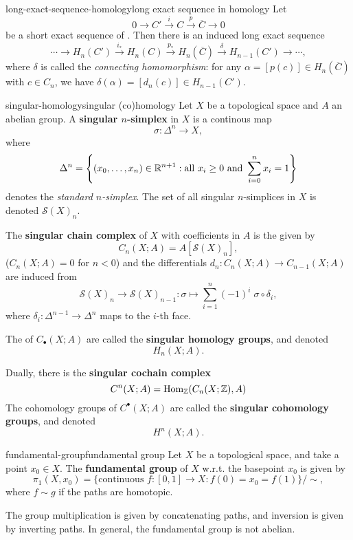 \begin{topic}{long-exact-sequence-homology}{long exact sequence in homology}
    Let
    \[ 0 \rightarrow C' \xrightarrow{i} C \xrightarrow{p} \overline{C} \rightarrow 0 \]
    be a short exact sequence of . Then there is an induced long exact sequence
    \[ \cdots \rightarrow H_n(C') \xrightarrow{i_*} H_n(C) \xrightarrow{p_*} H_n(\overline{C}) \xrightarrow{\delta} H_{n - 1}(C') \rightarrow \cdots , \]
    where $\delta$ is called the \textit{connecting homomorphism}: for any $\alpha = [ p(c) ] \in H_n(\overline{C})$ with $c \in C_n$, we have $\delta(\alpha) = [ d_n(c) ] \in H_{n - 1}(C')$.
\end{topic}

\begin{topic}{singular-homology}{singular (co)homology}
    Let $X$ be a topological space and $A$ an abelian group. A \textbf{singular $n$-simplex} in $X$ is a continous map
    \[ \sigma : \Delta^n \to X , \]
    where 
    \[ \Delta^n = \left\{ (x_0, \ldots, x_n) \in \mathbb{R}^{n + 1} : \text{all } x_i \ge 0 \text{ and } \sum_{i = 0}^n x_i = 1 \right\} \]
    denotes the \textit{standard $n$-simplex}. The set of all singular $n$-simplices in $X$ is denoted $\mathcal{S}(X)_n$.
    
    The \textbf{singular chain complex} of $X$ with coefficients in $A$ is the  given by
    \[ C_n(X; A) = A[\mathcal{S}(X)_n] , \]
    ($C_n(X; A) = 0$ for $n < 0$) and the differentials $d_n : C_n(X; A) \to C_{n - 1}(X; A)$ are induced from
    \[ \mathcal{S}(X)_n \to \mathcal{S}(X)_{n - 1} : \sigma \mapsto \sum_{i = 1}^{n} (-1)^i \; \sigma \circ \delta_i , \]
    where $\delta_i : \Delta^{n - 1} \to \Delta^n$ maps to the $i$-th face.
    
    The  of $C_\bullet(X; A)$ are called the \textbf{singular homology groups}, and denoted
    \[ H_n(X; A) . \]
    
    Dually, there is the \textbf{singular cochain complex}
    \[ C^n(X; A) = \text{Hom}_{\mathbb{Z}}(C_n(X; \mathbb{Z}), A) \]
    The cohomology groups of $C^\bullet(X; A)$ are called the \textbf{singular cohomology groups}, and denoted
    \[ H^n(X; A) . \]
\end{topic}

\begin{topic}{fundamental-group}{fundamental group}
    Let $X$ be a topological space, and take a point $x_0 \in X$. The \textbf{fundamental group} of $X$ w.r.t. the basepoint $x_0$ is given by
    \[ \pi_1(X, x_0) = \{ \text{continuous } f : [0, 1] \to X : f(0) = x_0 = f(1) \} / \sim{} , \]
    where $f \sim{} g$ if the paths are homotopic.
    
    The group multiplication is given by concatenating paths, and inversion is given by inverting paths. In general, the fundamental group is not abelian.
\end{topic}

